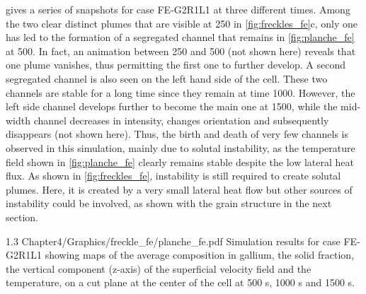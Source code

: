  gives a series of snapshots for case FE-G2R1L1 at three different times. Among the two clear distinct 
plumes that are visible at \SI{250}{\utime} in \cref{fig:freckles_fe}c, only one has led to the formation of a segregated channel
that remains in \cref{fig:planche_fe} at \SI{500}{\utime}. 
In fact, an animation between \SI{250}{\utime} and \SI{500}{\utime} (not shown here) reveals that one plume vanishes, 
thus permitting the first one to further develop. A second segregated channel is also seen on the left hand side of the cell. 
These two channels are stable for a long time since they remain at time \SI{1000}{\utime}. However, the left side channel 
develops further to become the main one at \SI{1500}{\utime}, while the mid-width channel decreases in intensity, changes 
orientation and subsequently disappears (not shown here). Thus, the birth and death of very few channels is observed in this 
simulation, mainly due to solutal instability, as the temperature field shown in \cref{fig:planche_fe} clearly remains stable despite 
the low lateral heat flux. As shown in \cref{fig:freckles_fe}, instability is still required to create solutal plumes. 
Here, it is created by a very small lateral heat flow but other sources of instability could be involved, as shown with the grain structure in the next section.

\begin{landscape}
\begin{figureth}
{1.3}
{Chapter4/Graphics/freckle_fe/planche_fe.pdf}
{Simulation results for case FE-G2R1L1 showing maps of the average composition in gallium,
the solid fraction, the vertical component (z-axis) of the superficial velocity field and the temperature, 
on a cut plane at the center of the cell at 500 s, 1000 s and 1500 s.}
\label{fig:planche_fe}
\end{figureth}
\end{landscape}

